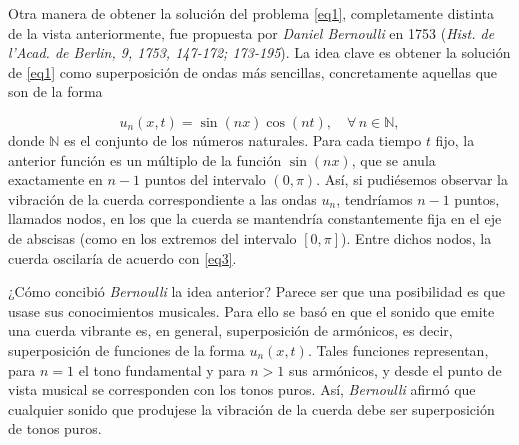 Otra manera de obtener la solución del problema \ref{eq1}, completamente distinta de la vista anteriormente, fue propuesta por \textit{Daniel Bernoulli} en 1753 (\textit{Hist. de l'Acad. de Berlin, 9, 1753, 147-172; 173-195}). La idea clave es obtener la solución de \ref{eq1} como superposición de ondas más sencillas, concretamente aquellas que son de la forma

\begin{equation}\label{eq3}
	u_n(x,t) = \sin(nx) \cos(nt), \quad \forall \, n \in \mathbb{N},
\end{equation}
\newline
donde $\mathbb{N}$ es el conjunto de los números naturales. Para cada tiempo $t$ fijo, la anterior función es un múltiplo de la función $\sin(nx)$, que se anula exactamente en $n-1$ puntos del intervalo $(0, \pi)$. Así, si pudiésemos observar la vibración de la cuerda correspondiente a las ondas \( u_n \), tendríamos \( n - 1 \) puntos, llamados
nodos, en los que la cuerda se mantendría constantemente fija en el eje de
abscisas (como en los extremos del intervalo \([0, \pi]\)). Entre dichos nodos, la
cuerda oscilaría de acuerdo con \ref{eq3}.

¿Cómo concibió \textit{Bernoulli} la idea anterior? Parece ser que una posibilidad es
que usase sus conocimientos musicales. Para ello se basó en que el sonido que
emite una cuerda vibrante es, en general, superposición de armónicos, es decir,
superposición de funciones de la forma \( u_n(x, t) \). Tales funciones representan,
para \( n = 1 \) el tono fundamental y para \( n > 1 \) sus armónicos, y desde el
punto de vista musical se corresponden con los tonos puros. Así, \textit{Bernoulli}
afirmó que cualquier sonido que produjese la vibración de la cuerda debe ser
superposición de tonos puros. 

